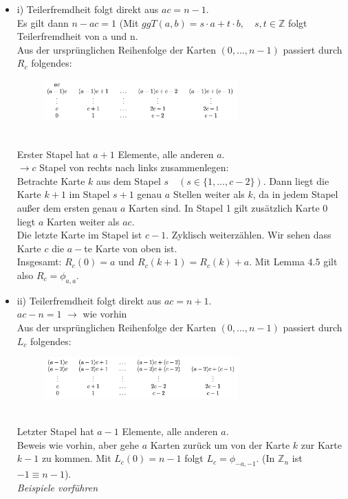 \documentclass[a4paper]{article}
\begin{document}
    \begin{beweis}
    \begin{itemize}
    \item i) Teilerfremdheit folgt direkt aus $ac = n - 1$. \\
    Es gilt dann $n - ac = 1$ (Mit $ggT(a,b) = s\cdot a + t\cdot b, \quad s,t \in \mathbb{Z}$ folgt Teilerfremdheit von a und n. \\
    Aus der ursprünglichen Reihenfolge der Karten $(0, …,n-1)$ passiert durch $R_c$ folgendes: 
    \begin{figure}[htbp] 
  \centering
     \includegraphics[width=0.7\textwidth]{image1.jpg}
\end{figure} \\
Erster Stapel hat $a+1$ Elemente, alle anderen $a$. \\
$\longrightarrow c$ Stapel von rechts nach links zusammenlegen: \\
Betrachte Karte $k$ aus dem Stapel $s \quad (s \in \lbrace 1, …, c-2\rbrace)$. Dann liegt die Karte $k+1$ im Stapel $s+1$ genau $a$ Stellen weiter als $k$, da in jedem Stapel außer dem ersten genau $a$ Karten sind. In Stapel 1 gilt zusätzlich Karte 0 liegt $a$ Karten weiter als $ac$. \\
Die letzte Karte im Stapel ist $c-1$. Zyklisch weiterzählen. Wir sehen dass Karte $c$ die $a-$te Karte von oben ist. \\
Insgesamt: $R_c(0) = a$ und $R_c(k+1) = R_c(k) + a$. Mit Lemma $4.5$ gilt also $R_c = \phi_{a,a}$.
    \item ii) Teilerfremdheit folgt direkt aus $ac = n+1$. \\
    $ac - n = 1$ $\longrightarrow$ wie vorhin \\
    Aus der ursprünglichen Reihenfolge der Karten $(0, …,n-1)$ passiert durch $L_c$ folgendes: 
    \begin{figure}[htbp] 
  \centering
     \includegraphics[width=0.7\textwidth]{image2.jpg}
\end{figure} \\
Letzter Stapel hat $a-1$ Elemente, alle anderen $a$. \\
Beweis wie vorhin, aber gehe $a$ Karten zurück um von der Karte $k$ zur Karte $k-1$ zu kommen. Mit $L_c(0) = n-1$ folgt $L_c = \phi_{-a,-1}$. (In $\mathbb{Z}_n$ ist $-1\equiv n-1$). \\
    \textit{Beispiele vorführen}
    \end{itemize}
    \end {beweis}
\end{document}
